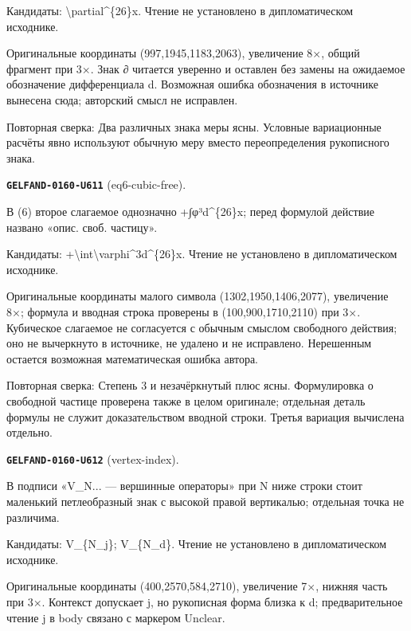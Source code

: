 Кандидаты: \textbackslash{}partial\textasciicircum{}\{26\}x. Чтение не установлено в дипломатическом исходнике.\par
Оригинальные координаты (997,1945,1183,2063), увеличение 8×, общий фрагмент при 3×. Знак ∂ читается уверенно и оставлен без замены на ожидаемое обозначение дифференциала d. Возможная ошибка обозначения в источнике вынесена сюда; авторский смысл не исправлен.\par
Повторная сверка: Два различных знака меры ясны. Условные вариационные расчёты явно используют обычную меру вместо переопределения рукописного знака.\par\medskip
\par\noindent\leavevmode{}\label{GELFAND-0160-U611}\label{GELFAND-P001484:eq6-cubic-free}\textbf{\texttt{GELFAND-0160-U611}} (eq6-cubic-free).\nopagebreak[4]\par
В (6) второе слагаемое однозначно +∫φ³d\textasciicircum{}\{26\}x; перед формулой действие названо «опис. своб. частицу».\par
Кандидаты: +\textbackslash{}int\textbackslash{}varphi\textasciicircum{}3d\textasciicircum{}\{26\}x. Чтение не установлено в дипломатическом исходнике.\par
Оригинальные координаты малого символа (1302,1950,1406,2077), увеличение 8×; формула и вводная строка проверены в (100,900,1710,2110) при 3×. Кубическое слагаемое не согласуется с обычным смыслом свободного действия; оно не вычеркнуто в источнике, не удалено и не исправлено. Нерешенным остается возможная математическая ошибка автора.\par
Повторная сверка: Степень 3 и незачёркнутый плюс ясны. Формулировка о свободной частице проверена также в целом оригинале; отдельная деталь формулы не служит доказательством вводной строки. Третья вариация вычислена отдельно.\par\medskip
\par\noindent\leavevmode{}\label{GELFAND-0160-U612}\label{GELFAND-P001484:vertex-index}\textbf{\texttt{GELFAND-0160-U612}} (vertex-index).\nopagebreak[4]\par
В подписи «V\_N... — вершинные операторы» при N ниже строки стоит маленький петлеобразный знак с высокой правой вертикалью; отдельная точка не различима.\par
Кандидаты: V\_\{N\_j\}; V\_\{N\_d\}. Чтение не установлено в дипломатическом исходнике.\par
Оригинальные координаты (400,2570,584,2710), увеличение 7×, нижняя часть при 3×. Контекст допускает j, но рукописная форма близка к d; предварительное чтение j в body связано с маркером Unclear.\par
